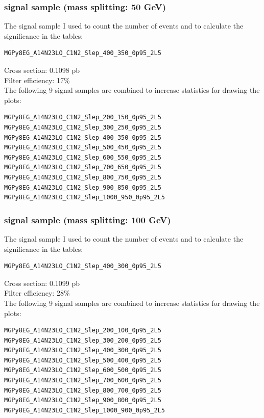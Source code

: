 \documentclass[mathserif,serif]{beamer}
\begin{document}
\begin{frame}[fragile]
\frametitle{signal sample (mass splitting: 50 GeV)}
\small
The signal sample I used to count the number of events and to calculate the significance in the tables:
\tiny
\begin{verbatim}
MGPy8EG_A14N23LO_C1N2_Slep_400_350_0p95_2L5
\end{verbatim}
\small
Cross section: 0.1098 pb \\
Filter efficiency: 17\% \\
\vspace{5mm}
The following 9 signal samples are combined to increase statistics for drawing the plots:
\tiny
\begin{verbatim}
MGPy8EG_A14N23LO_C1N2_Slep_200_150_0p95_2L5
MGPy8EG_A14N23LO_C1N2_Slep_300_250_0p95_2L5
MGPy8EG_A14N23LO_C1N2_Slep_400_350_0p95_2L5
MGPy8EG_A14N23LO_C1N2_Slep_500_450_0p95_2L5
MGPy8EG_A14N23LO_C1N2_Slep_600_550_0p95_2L5
MGPy8EG_A14N23LO_C1N2_Slep_700_650_0p95_2L5
MGPy8EG_A14N23LO_C1N2_Slep_800_750_0p95_2L5
MGPy8EG_A14N23LO_C1N2_Slep_900_850_0p95_2L5
MGPy8EG_A14N23LO_C1N2_Slep_1000_950_0p95_2L5
\end{verbatim}
\end{frame}

\begin{frame}[fragile]
\frametitle{signal sample (mass splitting: 100 GeV)}
\small
The signal sample I used to count the number of events and to calculate the significance in the tables:
\tiny
\begin{verbatim}
MGPy8EG_A14N23LO_C1N2_Slep_400_300_0p95_2L5
\end{verbatim}
\small
Cross section: 0.1099 pb \\
Filter efficiency: 28\% \\
\vspace{5mm}
The following 9 signal samples are combined to increase statistics for drawing the plots:
\tiny
\begin{verbatim}
MGPy8EG_A14N23LO_C1N2_Slep_200_100_0p95_2L5
MGPy8EG_A14N23LO_C1N2_Slep_300_200_0p95_2L5
MGPy8EG_A14N23LO_C1N2_Slep_400_300_0p95_2L5
MGPy8EG_A14N23LO_C1N2_Slep_500_400_0p95_2L5
MGPy8EG_A14N23LO_C1N2_Slep_600_500_0p95_2L5
MGPy8EG_A14N23LO_C1N2_Slep_700_600_0p95_2L5
MGPy8EG_A14N23LO_C1N2_Slep_800_700_0p95_2L5
MGPy8EG_A14N23LO_C1N2_Slep_900_800_0p95_2L5
MGPy8EG_A14N23LO_C1N2_Slep_1000_900_0p95_2L5
\end{verbatim}
\end{frame}
\end{document}
